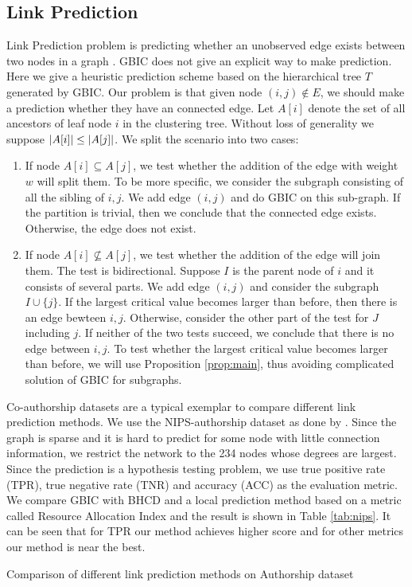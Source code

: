\subsection{Link Prediction}
Link Prediction problem is predicting whether an unobserved edge exists between two nodes in a graph \citep{liben2007link}.  GBIC does not give an explicit way to make prediction. Here we give a heuristic prediction scheme based on the hierarchical tree $T$ generated by GBIC.
Our problem is that given node $(i,j) \not\in E$, we should make a prediction whether they have an connected edge.
Let $A[i]$ denote the set of all ancestors of leaf node $i$ in the clustering tree. Without loss of generality we suppose $\lvert A[i]\rvert \leq \lvert A[j]\rvert$.
We split the scenario 
into two cases:
\begin{enumerate}
\item If node $A[i] \subseteq A[j]$, we test whether the addition of the edge with weight $w$ will split them. To be more specific, we consider the subgraph consisting of all the sibling of $i,j$. We add edge $(i,j)$ and do GBIC on this sub-graph. If the partition is trivial, then we conclude that the connected edge exists. Otherwise, the edge does not exist.

\item If node $A[i] \not\subseteq A[j]$, we test whether the addition of the edge will join them. The test is bidirectional. Suppose $I$ is the parent node of $i$ and it consists of several parts. We add edge $(i,j)$ and consider the subgraph $I \cup \{j\}$. If the largest critical value becomes larger than before, then there is an edge bewteen $i,j$. Otherwise, consider the other part of the test for $J$ including $j$. If neither of the two tests succeed, we conclude that there is no edge between $i,j$. To test whether the largest critical value becomes larger than before, we will use Proposition \ref{prop:main},  thus avoiding complicated solution of GBIC for subgraphs.
\end{enumerate}

Co-authorship datasets are a typical exemplar to compare different link prediction methods. We use the NIPS-authorship dataset as done by \cite{RN23}.
Since the graph is sparse and it is hard to predict for some node with little connection information, we restrict the network to the 234 nodes whose degrees are largest. Since the prediction  is a hypothesis testing problem, we use true positive rate (TPR), true negative rate (TNR) and accuracy (ACC) as the evaluation metric. We compare GBIC with BHCD and a local prediction method based on a metric called Resource Allocation Index \citep{zhou2009predicting} and the result is shown in Table \ref{tab:nips}. It can be seen that for TPR our method achieves higher score
and for other metrics our method is near the best.
\begin{table}
\centering

\caption{Comparison of different link prediction methods on Authorship dataset}\label{tab:nips}
\end{table}



